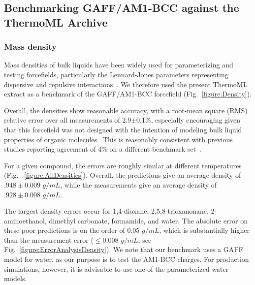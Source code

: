 \documentclass[aps,pre,twocolumn,nofootinbib,superscriptaddress,linenumbers]{revtex4-1}
\begin{document}

\subsection{Benchmarking GAFF/AM1-BCC against the ThermoML Archive}

\subsubsection{Mass density}

Mass densities of bulk liquids have been widely used for parameterizing and testing forcefields, particularly the Lennard-Jones parameters representing dispersive and repulsive interactions~\cite{jorgensen1983comparison, jorgensen1984optimized}.
We therefore used the present ThermoML extract as a benchmark of the GAFF/AM1-BCC forcefield (Fig.~\ref{figure:Density}).  

Overall, the densities show reasonable accuracy, with a root-mean square (RMS) relative error over all measurements of 2.9$\pm$0.1\%, especially encouraging given that this forcefield was not designed with the intention of modeling bulk liquid properties of organic molecules~\cite{gaff,gaff2}
This is reasonably consistent with previous studies reporting agreement of 4\% on a different benchmark set~\cite{caleman2011force}.

For a given compound, the errors are roughly similar at different temperatures (Fig. ~\ref{figure:AllDensities}).  Overall, the predictions give an average density of $.948 \pm 0.009$ $g / mL$, while the measurements give an average density of $.928 \pm 0.008$ $g / mL$.  

The largest density errors occur for 1,4-dioxane, 2,5,8-trioxanonane, 2-aminoethanol, dimethyl carbonate, formamide, and water.  The absolute error on these poor predictions is on the order of 0.05 $g / mL$, which is substantially higher than the measurement error ($\le 0.008$ $g / mL$; see Fig.~\ref{figure:ErrorAnalysisDensity}).  We note that our benchmark uses a GAFF model for water, as our purpose is to test the AM1-BCC charges.  For production simulations, however, it is advisable to use one of the parameterized water models.  


\end{document}
